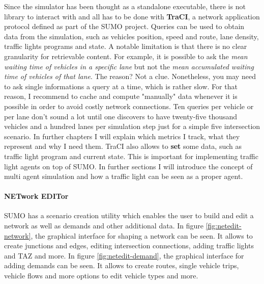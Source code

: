 Since the simulator has been thought as a standalone executable, there is not library to interact with and all has to be done with \textbf{TraCI}, a network application protocol defined as part of the SUMO project. Queries can be used to obtain data from the simulation, such as vehicles position, speed and route, lane density, traffic lights programs and state. A notable limitation is that there is no clear granularity for retrievable content. For example, it is possible to ask the \textit{mean waiting time of vehicles in a specific lane} but not the \textit{mean accumulated waiting time of vehicles of that lane}. The reason? Not a clue. Nonetheless, you may need to ask single informations a query at a time, which is rather slow. For that reason, I recommend to cache and compute "manually" data whenever it is possible in order to avoid costly network connections. Ten queries per vehicle or per lane don't sound a lot until one discovers to have twenty-five thousand vehicles and a hundred lanes per simulation step just for a simple five intersection scenario. In further chapters I will explain which metrics I track, what they represent and why I need them. TraCI also allows to \textbf{set} some data, such as traffic light program and current state. This is important for implementing traffic light agents on top of SUMO. In further sections I will introduce the concept of multi agent simulation and how a traffic light can be seen as a proper agent.

\paragraph{\textbf{NET}work \textbf{EDIT}or}

SUMO has a scenario creation utility which enables the user to build and edit a network as well as demands and other additional data.
In figure \ref{fig:netedit-network}, the graphical interface for shaping a network can be seen. It allows to create junctions and edges, editing intersection connections, adding traffic lights and TAZ and more.
In figure \ref{fig:netedit-demand}, the graphical interface for adding demands can be seen. It allows to create routes, single vehicle trips, vehicle flows and more options to edit vehicle types and more.


